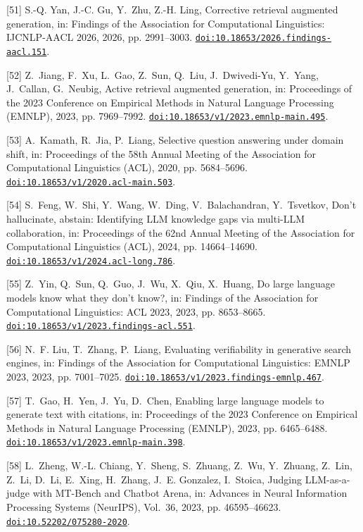 [51] S.-Q. Yan, J.-C. Gu, Y.~Zhu, Z.-H. Ling, Corrective retrieval augmented generation, in: Findings of the Association for Computational Linguistics: IJCNLP-AACL 2026, 2026, pp. 2991--3003. \href {https://doi.org/10.18653/2026.findings-aacl.151} {\texttt{doi:10.18653/2026.findings-aacl.151}}.

[52] Z.~Jiang, F.~Xu, L.~Gao, Z.~Sun, Q.~Liu, J.~Dwivedi-Yu, Y.~Yang, J.~Callan, G.~Neubig, Active retrieval augmented generation, in: Proceedings of the 2023 Conference on Empirical Methods in Natural Language Processing ({EMNLP}), 2023, pp. 7969--7992. \href {https://doi.org/10.18653/v1/2023.emnlp-main.495} {\texttt{doi:10.18653/v1/2023.emnlp-main.495}}.

[53] A.~Kamath, R.~Jia, P.~Liang, Selective question answering under domain shift, in: Proceedings of the 58th Annual Meeting of the Association for Computational Linguistics ({ACL}), 2020, pp. 5684--5696. \href {https://doi.org/10.18653/v1/2020.acl-main.503} {\texttt{doi:10.18653/v1/2020.acl-main.503}}.

[54] S.~Feng, W.~Shi, Y.~Wang, W.~Ding, V.~Balachandran, Y.~Tsvetkov, Don't hallucinate, abstain: Identifying {LLM} knowledge gaps via multi-{LLM} collaboration, in: Proceedings of the 62nd Annual Meeting of the Association for Computational Linguistics (ACL), 2024, pp. 14664--14690. \href {https://doi.org/10.18653/v1/2024.acl-long.786} {\texttt{doi:10.18653/v1/2024.acl-long.786}}.

[55] Z.~Yin, Q.~Sun, Q.~Guo, J.~Wu, X.~Qiu, X.~Huang, Do large language models know what they don't know?, in: Findings of the Association for Computational Linguistics: ACL 2023, 2023, pp. 8653--8665. \href {https://doi.org/10.18653/v1/2023.findings-acl.551} {\texttt{doi:10.18653/v1/2023.findings-acl.551}}.

[56] N.~F. Liu, T.~Zhang, P.~Liang, Evaluating verifiability in generative search engines, in: Findings of the Association for Computational Linguistics: EMNLP 2023, 2023, pp. 7001--7025. \href {https://doi.org/10.18653/v1/2023.findings-emnlp.467} {\texttt{doi:10.18653/v1/2023.findings-emnlp.467}}.

[57] T.~Gao, H.~Yen, J.~Yu, D.~Chen, Enabling large language models to generate text with citations, in: Proceedings of the 2023 Conference on Empirical Methods in Natural Language Processing (EMNLP), 2023, pp. 6465--6488. \href {https://doi.org/10.18653/v1/2023.emnlp-main.398} {\texttt{doi:10.18653/v1/2023.emnlp-main.398}}.

[58] L.~Zheng, W.-L. Chiang, Y.~Sheng, S.~Zhuang, Z.~Wu, Y.~Zhuang, Z.~Lin, Z.~Li, D.~Li, E.~Xing, H.~Zhang, J.~E. Gonzalez, I.~Stoica, Judging {LLM}-as-a-judge with {MT-Bench} and {Chatbot Arena}, in: Advances in Neural Information Processing Systems (NeurIPS), Vol.~36, 2023, pp. 46595--46623. \href {https://doi.org/10.52202/075280-2020} {\texttt{doi:10.52202/075280-2020}}.

